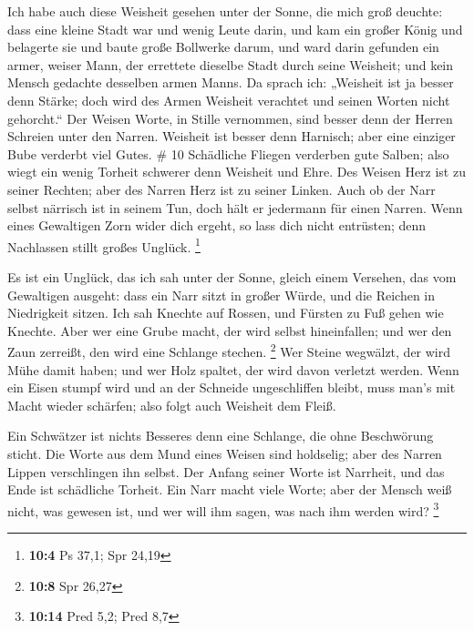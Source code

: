  Ich habe auch diese Weisheit gesehen unter der Sonne, die
mich groß deuchte:  dass eine kleine Stadt war und wenig
Leute darin, und kam ein großer König und belagerte sie und baute große
Bollwerke darum,  und ward darin gefunden ein armer, weiser
Mann, der errettete dieselbe Stadt durch seine Weisheit; und kein Mensch
gedachte desselben armen Manns.  Da sprach ich: „Weisheit
ist ja besser denn Stärke; doch wird des Armen Weisheit verachtet und
seinen Worten nicht gehorcht.``  Der Weisen Worte, in
Stille vernommen, sind besser denn der Herren Schreien unter den Narren.
 Weisheit ist besser denn Harnisch; aber eine einziger Bube
verderbt viel Gutes. \# 10  Schädliche Fliegen verderben
gute Salben; also wiegt ein wenig Torheit schwerer denn Weisheit und
Ehre.  Des Weisen Herz ist zu seiner Rechten; aber des
Narren Herz ist zu seiner Linken.  Auch ob der Narr selbst
närrisch ist in seinem Tun, doch hält er jedermann für einen Narren.
 Wenn eines Gewaltigen Zorn wider dich ergeht, so lass dich
nicht entrüsten; denn Nachlassen stillt großes Unglück. \footnote{\textbf{10:4}
  Ps 37,1; Spr 24,19}

 Es ist ein Unglück, das ich sah unter der Sonne, gleich
einem Versehen, das vom Gewaltigen ausgeht:  dass ein Narr
sitzt in großer Würde, und die Reichen in Niedrigkeit sitzen.
 Ich sah Knechte auf Rossen, und Fürsten zu Fuß gehen wie
Knechte.  Aber wer eine Grube macht, der wird selbst
hineinfallen; und wer den Zaun zerreißt, den wird eine Schlange stechen.
\footnote{\textbf{10:8} Spr 26,27}  Wer Steine wegwälzt, der
wird Mühe damit haben; und wer Holz spaltet, der wird davon verletzt
werden.  Wenn ein Eisen stumpf wird und an der Schneide
ungeschliffen bleibt, muss man's mit Macht wieder schärfen; also folgt
auch Weisheit dem Fleiß.

 Ein Schwätzer ist nichts Besseres denn eine Schlange, die
ohne Beschwörung sticht.  Die Worte aus dem Mund eines
Weisen sind holdselig; aber des Narren Lippen verschlingen ihn selbst.
 Der Anfang seiner Worte ist Narrheit, und das Ende ist
schädliche Torheit.  Ein Narr macht viele Worte; aber der
Mensch weiß nicht, was gewesen ist, und wer will ihm sagen, was nach ihm
werden wird? \footnote{\textbf{10:14} Pred 5,2; Pred 8,7}

